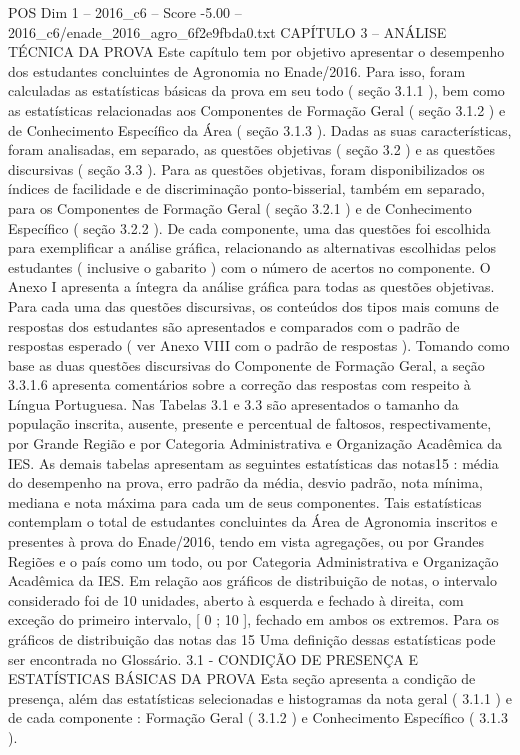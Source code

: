 \begin{textsample}{POS Dim 1 – 2016\_c6 – Score -5.00 – 2016\_c6/enade\_2016\_agro\_6f2e9fbda0.txt}  \label{ex:f1_pos_400}
CAPÍTULO 3 – ANÁLISE TÉCNICA DA PROVA Este capítulo tem por objetivo apresentar o desempenho dos estudantes concluintes de Agronomia no Enade/2016.
Para isso, foram calculadas as estatísticas básicas da prova em seu todo ( seção 3.1.1 ), bem como as estatísticas relacionadas aos Componentes de Formação Geral ( seção 3.1.2 ) e de Conhecimento Específico da Área ( seção 3.1.3 ).
Dadas as suas características, foram analisadas, em separado, as questões objetivas ( seção 3.2 ) e as questões discursivas ( seção 3.3 ).
Para as questões objetivas, foram disponibilizados os índices de facilidade e de discriminação ponto-bisserial, também em separado, para os Componentes de Formação Geral ( seção 3.2.1 ) e de Conhecimento Específico ( seção 3.2.2 ).
De cada componente, uma das questões foi escolhida para exemplificar a análise gráfica, relacionando as alternativas escolhidas pelos estudantes ( inclusive o gabarito ) com o número de acertos no componente.
O Anexo I apresenta a íntegra da análise gráfica para todas as questões objetivas.
Para cada uma das questões discursivas, os conteúdos dos tipos mais comuns de respostas dos estudantes são apresentados e comparados com o padrão de respostas esperado ( ver Anexo VIII com o padrão de respostas ).
Tomando como base as duas questões discursivas do Componente de Formação Geral, a seção 3.3.1.6 apresenta comentários sobre a correção das respostas com respeito à Língua Portuguesa.
Nas Tabelas 3.1 e 3.3 são apresentados o tamanho da população inscrita, ausente, presente e percentual de faltosos, respectivamente, por Grande Região e por Categoria Administrativa e Organização Acadêmica da IES.
As demais tabelas apresentam as seguintes estatísticas das notas15 : média do desempenho na prova, erro padrão da média, desvio padrão, nota mínima, mediana e nota máxima para cada um de seus componentes.
Tais estatísticas contemplam o total de estudantes concluintes da Área de Agronomia inscritos e presentes à prova do Enade/2016, tendo em vista agregações, ou por Grandes Regiões e o país como um todo, ou por Categoria Administrativa e Organização Acadêmica da IES.
Em relação aos gráficos de distribuição de notas, o intervalo considerado foi de 10 unidades, aberto à esquerda e fechado à direita, com exceção do primeiro intervalo, [ 0 ; 10 ], fechado em ambos os extremos.
Para os gráficos de distribuição das notas das 15 Uma definição dessas estatísticas pode ser encontrada no Glossário. 3.1 - CONDIÇÃO DE PRESENÇA E ESTATÍSTICAS BÁSICAS DA PROVA Esta seção apresenta a condição de presença, além das estatísticas selecionadas e histogramas da nota geral ( 3.1.1 ) e de cada componente : Formação Geral ( 3.1.2 ) e Conhecimento Específico ( 3.1.3 ).

\end{textsample}
